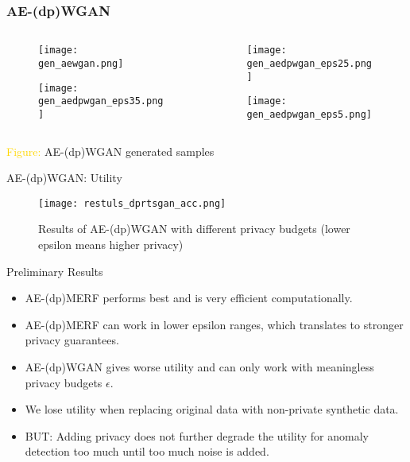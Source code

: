 \begin{frame}
    \frametitle{AE-(dp)WGAN}

    \begin{columns}
        \begin{column}{0.48\textwidth}
        \begin{figure}
            \centering
            \texttt{[image: gen\_aewgan.png]}
        \end{figure}
        \begin{figure}[h]
            \centering
            \texttt{[image: gen\_aedpwgan\_eps35.png]}
        \end{figure}
    \end{column}
    \begin{column}{0.48\textwidth}
        \begin{figure}
            \centering
            \texttt{[image: gen\_aedpwgan\_eps25.png]}
        \end{figure}
        \begin{figure}[h]
            \centering
            \texttt{[image: gen\_aedpwgan\_eps5.png]}
        \end{figure}
    \end{column}
    
    \end{columns}
    \centering
    \textcolor{gold}{Figure:} AE-(dp)WGAN generated samples

\end{frame}

\begin{frame}{AE-(dp)WGAN: Utility}
    \begin{figure}
        \centering
        \texttt{[image: restuls\_dprtsgan\_acc.png]}
        \caption{Results of AE-(dp)WGAN with different privacy budgets (lower epsilon means higher privacy)}
        \label{fig:enter-label}
    \end{figure}
\end{frame}

\begin{frame}{Preliminary Results}
    \begin{itemize}
        \item<1-> \alert{AE-(dp)MERF performs best} and is very efficient computationally.
        \item<2-> AE-(dp)MERF can work in \alert{lower epsilon ranges}, which translates to \alert{stronger privacy guarantees}.
        \item<3-> \alert{AE-(dp)WGAN gives worse utility} and can only work with meaningless privacy budgets $\epsilon$.
        \item<4-> We lose utility when \alert{replacing original data with non-private synthetic} data.
        \item<5-> BUT: Adding \alert{privacy does not further degrade the utility} for anomaly detection too much until too much noise is added.
    \end{itemize}
\end{frame}

